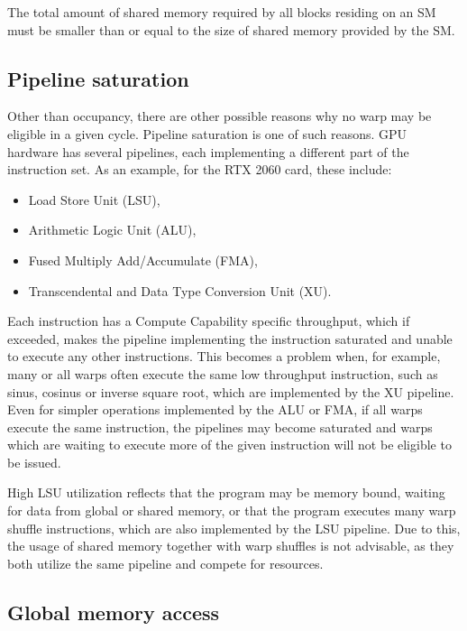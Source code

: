 The total amount of shared memory required by all blocks residing on an SM must be smaller than or equal to the size of shared memory provided by the SM. 

\subsection{Pipeline saturation}
\label{sec:cuda_pipelines}

Other than occupancy, there are other possible reasons why no warp may be eligible in a given cycle. Pipeline saturation is one of such reasons. GPU hardware has several pipelines, each implementing a different part of the instruction set. As an example, for the RTX 2060 card, these include:
\begin{itemize}
	\item Load Store Unit (LSU),
	\item Arithmetic Logic Unit (ALU),
	\item Fused Multiply Add/Accumulate (FMA),
	\item Transcendental and Data Type Conversion Unit (XU).
\end{itemize}

Each instruction has a Compute Capability specific throughput, which if exceeded, makes the pipeline implementing the instruction saturated and unable to execute any other instructions. This becomes a problem when, for example, many or all warps often execute the same low throughput instruction, such as sinus, cosinus or inverse square root, which are implemented by the XU pipeline. Even for simpler operations implemented by the ALU or FMA, if all warps execute the same instruction, the pipelines may become saturated and warps which are waiting to execute more of the given instruction will not be eligible to be issued.

High LSU utilization reflects that the program may be memory bound, waiting for data from global or shared memory, or that the program executes many warp shuffle instructions, which are also implemented by the LSU pipeline. Due to this, the usage of shared memory together with warp shuffles is not advisable, as they both utilize the same pipeline and compete for resources.


\subsection{Global memory access}

